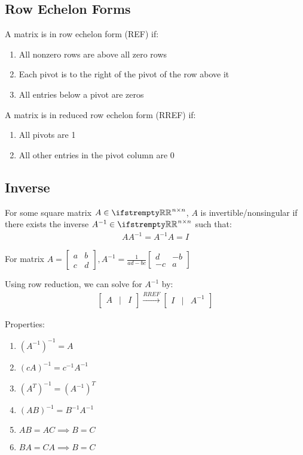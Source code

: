 \documentclass[12pt, a4paper]{article}
\begin{document}
\begin{multicols*}{3}
\subsection{Row Echelon Forms}
A matrix is in row echelon form (REF) if:
\begin{enumerate}[\roman*.]
  \item All nonzero rows are above all zero rows
  \item Each pivot is to the right of the pivot of the row above it
  \item All entries below a pivot are zeros
\end{enumerate}

A matrix is in reduced row echelon form (RREF) if:
\begin{enumerate}[\roman*.]
  \item All pivots are 1
  \item All other entries in the pivot column are 0
\end{enumerate}

\colbreak

\subsection{Inverse}
For some square matrix $A \in \RR^{n\times n}$, $A$ is invertible/nonsingular if there exists the inverse $A^{-1} \in \RR^{n\times n}$ such that:
\begin{align*}
  AA^{-1} = A^{-1}A = I
\end{align*}

For matrix $A = \begin{bmatrix} a & b \\ c & d\end{bmatrix}, A^{-1} = \frac{1}{ad-bc}\begin{bmatrix} d & -b \\ -c & a\end{bmatrix}$

Using row reduction, we can solve for $A^{-1}$ by:
\begin{align*}
  \begin{bmatrix}A & | & I\end{bmatrix} \xrightarrow{RREF} \begin{bmatrix}I & | & A^{-1}\end{bmatrix}
\end{align*}

Properties:
\begin{enumerate}[\roman*.]
  \item $(A^{-1})^{-1} = A$
  \item $(cA)^{-1} = c^{-1}A^{-1}$
  \item $(A^T)^{-1} = (A^{-1})^T$
  \item $(AB)^{-1} = B^{-1}A^{-1}$
  \item $AB = AC \implies B = C$
  \item $BA = CA \implies B = C$
\end{enumerate}


\end{multicols*}
\end{document}
